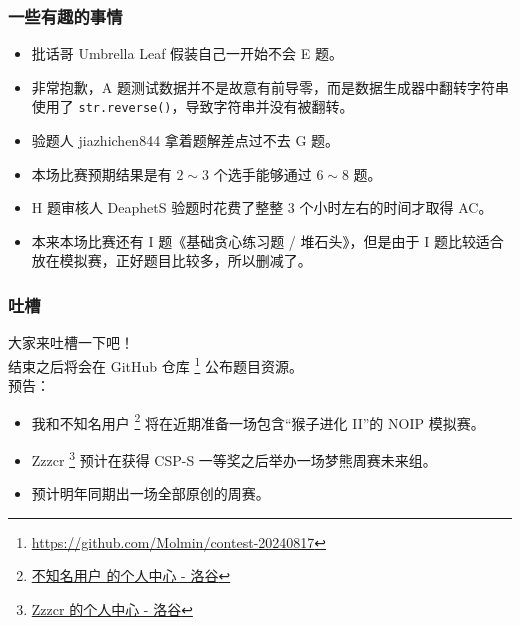 \documentclass{beamer}
\begin{document}
\begin{frame}
\frametitle{一些有趣的事情}
\begin{itemize}
\item  批话哥 Umbrella Leaf 假装自己一开始不会 E 题。\\
\pause
\item  非常抱歉，A 题测试数据并不是故意有前导零，而是数据生成器中翻转字符串使用了 \texttt{str.reverse()}，导致字符串并没有被翻转。\\
\pause
\item  验题人 jiazhichen844 拿着题解差点过不去 G 题。\\
\pause
\item  本场比赛预期结果是有 $2 \sim 3$ 个选手能够通过 $6 \sim 8$ 题。\\
\pause
\item  H 题审核人 DeaphetS 验题时花费了整整 3 个小时左右的时间才取得 AC。\\
\pause
\item  本来本场比赛还有 I 题《基础贪心练习题 / 堆石头》，但是由于 I 题比较适合放在模拟赛，正好题目比较多，所以删减了。
\end{itemize}
\end{frame}

\begin{frame}
\frametitle{吐槽}
大家来吐槽一下吧！\\
结束之后将会在 GitHub 仓库 \footnote{\url{https://github.com/Molmin/contest-20240817}} 公布题目资源。\\
预告：
\begin{itemize}
\item 我和不知名用户 \footnote{\href{https://www.luogu.com.cn/user/316358}{不知名用户 的个人中心 - 洛谷}} 将在近期准备一场包含“猴子进化 II”的 NOIP 模拟赛。
\item Zzzcr \footnote{\href{https://www.luogu.com.cn/user/761491}{Zzzcr 的个人中心 - 洛谷}} 预计在获得 CSP-S 一等奖之后举办一场梦熊周赛未来组。
\item 预计明年同期出一场全部原创的周赛。
\end{itemize}

\end{frame}
\end{document}
